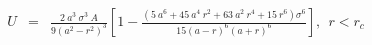 


\begin{eqnarray}
	U &=& \frac{2 ~ a^3 ~ \sigma^3 ~ A}{9 \left( a^2 - r^2 \right)^3} 
 \left[ 1 - \frac{\left(5 ~ a^6+45~a^4~r^2+63~a^2~r^4+15~r^6\right) \sigma^6}
 {15 \left(a-r\right)^6 \left( a+r \right)^6} \right], ~~ r < r_c \nonumber
\end{eqnarray}



